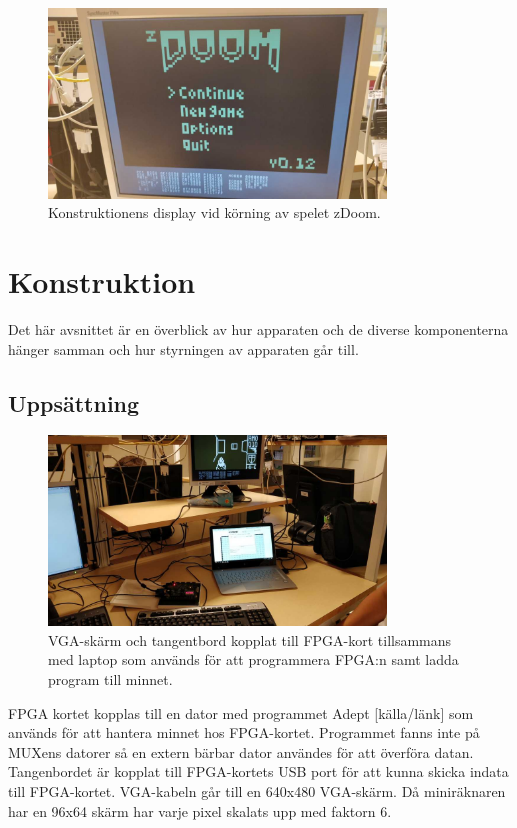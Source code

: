 \documentclass[main.tex]{subfiles}
\begin{document}
\begin{figure}
    \center
    \includegraphics[width=0.8\textwidth,bb=0 0 1152 648]{img/monitor_small.jpg}
    \caption{Konstruktionens display vid körning av spelet zDoom.}
\end{figure}
\section{Konstruktion}
Det här avsnittet är en överblick av hur apparaten och de diverse komponenterna
hänger samman och hur styrningen av apparaten går till.
\subsection{Uppsättning}
\begin{figure}
    \center
    \includegraphics[width=0.8\textwidth,bb=0 0 1152 648]{img/setup_small.jpg}
    \caption{VGA-skärm och tangentbord kopplat till FPGA-kort tillsammans med
    laptop som används för att programmera FPGA:n samt ladda program till
    minnet.}
\end{figure}

FPGA kortet kopplas till en dator med programmet Adept [källa/länk] som används
för att hantera minnet hos FPGA-kortet. Programmet fanns inte på MUXens datorer
så en extern bärbar dator användes för att överföra datan. Tangenbordet är
kopplat till FPGA-kortets USB port för att kunna skicka indata till
FPGA-kortet. VGA-kabeln går till en 640x480 VGA-skärm.  Då miniräknaren har en
96x64 skärm har varje pixel skalats upp med faktorn 6.
\end{document}
